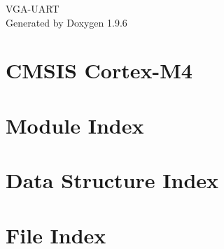 \documentclass[twoside]{book}
\newcommand{\+}{\discretionary{\mbox{\scriptsize$\hookleftarrow$}}{}{}}
\newcommand{\clearemptydoublepage}{%
    \newpage{\pagestyle{empty}\cleardoublepage}%
  }
\begin{document}
  \raggedbottom
    \hypersetup{pageanchor=false,
                bookmarksnumbered=true,
                pdfencoding=unicode
               }
  \begin{titlepage}
  \vspace*{7cm}
  \begin{center}%
  {\Large VGA-\/\+UART}\\
  \vspace*{1cm}
  {\large Generated by Doxygen 1.9.6}\\
  \end{center}
  \end{titlepage}
  \clearemptydoublepage
  \tableofcontents
  \clearemptydoublepage
  \hypersetup{pageanchor=true}
\chapter{CMSIS Cortex-\/\+M4}
\label{index}\hypertarget{index}{}
\chapter{Module Index}

\chapter{Data Structure Index}

\chapter{File Index}

\end{document}
